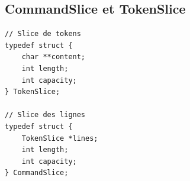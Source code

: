 \documentclass{article}
\begin{document}
\subsection{CommandSlice et TokenSlice}

\begin{verbatim}
// Slice de tokens
typedef struct {
    char **content;
    int length;
    int capacity;
} TokenSlice;

// Slice des lignes
typedef struct {
    TokenSlice *lines;
    int length;
    int capacity;
} CommandSlice;
\end{verbatim}
\end{document}
